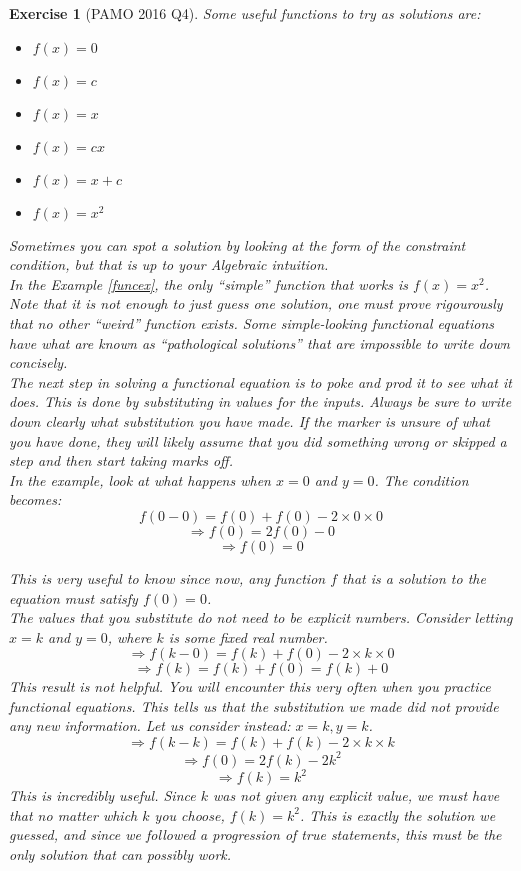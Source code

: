 \documentclass[a4paper,12pt]{article}
\newtheorem{exercise}{Exercise}[section]
\begin{document}
\begin{exercise}[PAMO 2016 Q4]
Some useful functions to try as solutions are:
\begin{itemize}
    \item $f(x) = 0$
    \item $f(x) = c$
    \item $f(x) = x$
    \item $f(x) = cx$
    \item $f(x) = x + c$
    \item $f(x) = x^2$
\end{itemize}
Sometimes you can spot a solution by looking at the form of the constraint condition, but that is up to your Algebraic intuition. \\

In the Example \ref{funcex}, the only ``simple'' function that works is $f(x) = x^2$. Note that it is not enough to just guess one solution, one must prove rigourously that no other ``weird'' function exists. Some simple-looking functional equations have what are known as ``pathological solutions'' that are impossible to write down concisely.\\

The next step in solving a functional equation is to poke and prod it to see what it does. This is done by substituting in values for the inputs. Always be sure to write down clearly what substitution you have made. If the marker is unsure of what you have done, they will likely assume that you did something wrong or skipped a step and then start taking marks off.\\
In the example, look at what happens when $x = 0$ and $y = 0$. The condition becomes:
$$ f(0 - 0) = f(0) + f(0) - 2 \times 0 \times 0$$
$$\Rightarrow f(0) = 2f(0) - 0$$
$$\Rightarrow f(0) = 0$$

This is very useful to know since now, any function $f$ that is a solution to the equation \emph{must} satisfy $f(0) = 0$. \\

The values that you substitute do not need to be explicit numbers. Consider letting $x = k$ and $y = 0$, where $k$ is some fixed real number.
$$\Rightarrow f(k - 0) = f(k) + f(0) - 2 \times k \times 0$$
$$\Rightarrow f(k) = f(k) + f(0) = f(k) + 0$$
This result is not helpful. You will encounter this very often when you practice functional equations. This tells us that the substitution we made did not provide any new information. Let us consider instead: $x = k, y = k$.
$$\Rightarrow f(k - k) = f(k) + f(k) - 2 \times k \times k$$
$$\Rightarrow f(0) = 2f(k) - 2k^2$$
$$\Rightarrow f(k) = k^2$$
This is incredibly useful. Since $k$ was not given any explicit value, we must have that no matter which $k$ you choose, $f(k) = k^2$. This is exactly the solution we guessed, and since we followed a progression of true statements, this must be the \emph{only} solution that can possibly work. \\


\end{exercise}
\end{document}

